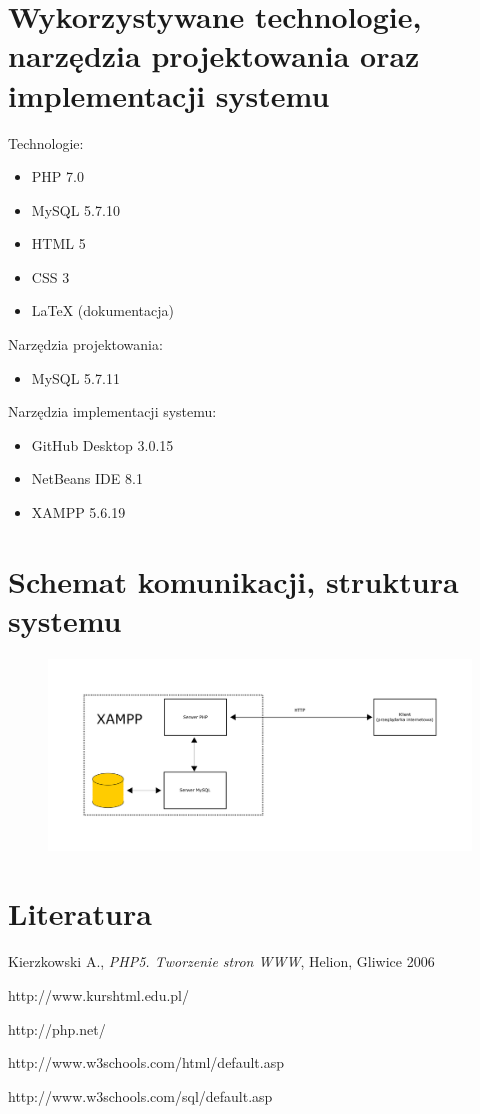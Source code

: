 \documentclass[a4paper, 11pt]{article}
\begin{document}
\section{Wykorzystywane technologie, narzędzia projektowania oraz implementacji systemu}
Technologie:
\begin{itemize}
	\item PHP 7.0
	\item MySQL 5.7.10
	\item HTML 5
	\item CSS 3
	\item LaTeX (dokumentacja)
\end{itemize}
Narzędzia projektowania:
\begin{itemize}
	\item MySQL 5.7.11
\end{itemize}
Narzędzia implementacji systemu:
\begin{itemize}
	\item GitHub Desktop 3.0.15
	\item NetBeans IDE 8.1
	\item XAMPP 5.6.19
\end{itemize}
\section{Schemat komunikacji, struktura systemu}
\begin{figure}[h]
	\includegraphics[width=15cm]{schemat.png}
\end{figure}
\section{Literatura}
\begin{enumerate}[label={[\arabic*]}]
	\item Kierzkowski A., \textit{PHP5. Tworzenie stron WWW}, Helion, Gliwice 2006
	\item http://www.kurshtml.edu.pl/
	\item http://php.net/
	\item http://www.w3schools.com/html/default.asp
	\item http://www.w3schools.com/sql/default.asp
\end{enumerate}
\end{document}
